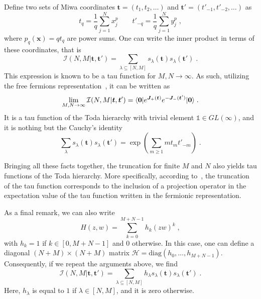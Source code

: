 \documentclass[a4paper,11pt]{amsart}
\begin{document}
Define two sets of Miwa coordinates \(\bm{t} = (t_1, t_2, \dots)\) and
\(\bm{t}' = (t'_{-1}, t'_{-2}, \dots)\) as
\begin{equation}
  t_q = \frac{1}{q}\sum_{j=1}^N x_j^p\qquad 
  t'_{-q} = \frac{1}{q}\sum_{j=1}^N y_j^p\; , 
\end{equation}
where \(p_q(\bm{x}) = q t_q\) are power sums. One can write the inner
product in terms of these coordinates, that is
\begin{equation}
  \mathcal{I}(N, M|\bm{t}, \bm{t}') = \sum_{\lambda\subseteq [N,M]} s_\lambda(\bm{t}) s_\lambda(\bm{t}') \; .
\end{equation}
This expression is known to be a tau function for \(M, N\to \infty\).
As such, utilizing the free fermions representation~\cite{Alexandrov:2012tr}, it can be written as
\begin{equation}
  \lim_{M,N\to \infty}\mathcal{I}(N, M|\bm{t}, \bm{t}')
 = \langle\bm{0}\rvert e^{\bm{J}_+(\bm{t})} e^{-\bm{J}_-(\bm{t}')} \lvert\bm{0}\rangle\; .
\end{equation}
It is a tau function of the Toda hierarchy with trivial element
\(\mathbb{1} \in GL(\infty)\), and it is nothing but the Cauchy's
identity
\begin{equation}
  \sum_{\lambda } s_{\lambda}(\bm{t}) s_{\lambda}(\bm{t}')
    = \exp \left( \sum_{m\geq1} m t_m t'_{-m} \right) \; .
\end{equation}

Bringing all these facts together, the truncation for finite \(M\) and
\(N\) also yields tau functions of the Toda hierarchy. More
specifically, according to~\cite{Alexandrov:2012tr, Kharchev:1991gd,
  Zabrodin:2010ii}, the truncation of the tau function corresponds to
the inclusion of a projection operator in the expectation value of the
tau function written in the fermionic representation.

As a final remark, we can also write
\begin{equation}
  H(z,w) = \sum_{k=0}^{M+N-1} h_k(zw)^{k} \; , 
\end{equation}
with \(h_k=1\) if \(k\in [0, M+N-1]\) and \(0\) otherwise. In this
case, one can define a diagonal \((N+M)\times (N+M)\) matrix
\(\mathcal{H} = \textrm{diag}(h_0, \dots, h_{M+N-1})\). Consequently,
if we repeat the arguments above, we find
\begin{equation}
\mathcal{I}(N, M|\bm{t}, \bm{t}') = \sum_{\lambda \subseteq [N,M]} h_\lambda s_\lambda(\bm{t}) s_\lambda(\bm{t}') \; .
\end{equation}
Here, \(h_\lambda\) is equal to \(1\) if \(\lambda \in [N,M]\), and it
is zero otherwise.
\end{document}
